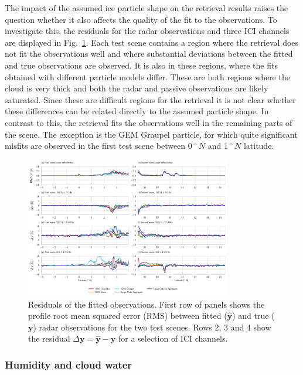 \documentclass[journal abbreviation, manuscript]{copernicus}
\begin{document}
The impact of the assumed ice particle shape on the retrieval results raises the
question whether it also affects the quality of the fit to the observations. To
investigate this, the residuals for the radar observations and three ICI
channels are displayed in Fig.~\ref{fig:misfit}. Each test scene contains a
region where the retrieval does not fit the observations well and where
substantial deviations between the fitted and true observations are observed. It
is also in these regions, where the fits obtained with different particle models
differ. These are both regions where the cloud is very thick and both the radar
and passive observations are likely saturated. Since these are difficult regions
for the retrieval it is not clear whether these differences can be related
directly to the assumed particle shape. In contrast to this, the retrieval fits
the observations well in the remaining parts of the scene. The exception is the
GEM Graupel particle, for which quite significant misfits are observed in the
first test scene between $0\ \unit{^{\circ}\ N}$ and $1\ \unit{^{\circ}\ N}$
latitude.

\begin{figure}[!h]
\centering
\includegraphics[width = 0.8\textwidth]{../plots/misfits}
\caption{Residuals of the fitted observations. First row of panels shows the
  profile root mean squared error (RMS) between fitted ($\hat{\mathbf{y}}$) and
  true ($\mathbf{y}$) radar observations for the two test scenes. Rows 2, 3 and
  4 show the residual $\Delta \mathbf{y} = \hat{\mathbf{y}} - \mathbf{y}$ for a
  selection of ICI channels.}
\label{fig:misfit}
\end{figure}

\subsubsection{Humidity and cloud water}
\end{document}
